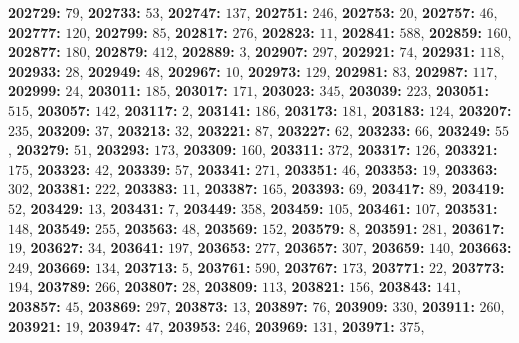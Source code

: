 \textsf{\bfseries 202729:} $79$, \textsf{\bfseries 202733:} $53$, \textsf{\bfseries 202747:} $137$, \textsf{\bfseries 202751:} $246$, \textsf{\bfseries 202753:} $20$, \textsf{\bfseries 202757:} $46$, \textsf{\bfseries 202777:} $120$, \textsf{\bfseries 202799:} $85$, \textsf{\bfseries 202817:} $276$, \textsf{\bfseries 202823:} $11$, \textsf{\bfseries 202841:} $588$, \textsf{\bfseries 202859:} $160$, \textsf{\bfseries 202877:} $180$, \textsf{\bfseries 202879:} $412$, \textsf{\bfseries 202889:} $3$, \textsf{\bfseries 202907:} $297$, \textsf{\bfseries 202921:} $74$, \textsf{\bfseries 202931:} $118$, \textsf{\bfseries 202933:} $28$, \textsf{\bfseries 202949:} $48$, \textsf{\bfseries 202967:} $10$, \textsf{\bfseries 202973:} $129$, \textsf{\bfseries 202981:} $83$, \textsf{\bfseries 202987:} $117$, \textsf{\bfseries 202999:} $24$, \textsf{\bfseries 203011:} $185$, \textsf{\bfseries 203017:} $171$, \textsf{\bfseries 203023:} $345$, \textsf{\bfseries 203039:} $223$, \textsf{\bfseries 203051:} $515$, \textsf{\bfseries 203057:} $142$, \textsf{\bfseries 203117:} $2$, \textsf{\bfseries 203141:} $186$, \textsf{\bfseries 203173:} $181$, \textsf{\bfseries 203183:} $124$, \textsf{\bfseries 203207:} $235$, \textsf{\bfseries 203209:} $37$, \textsf{\bfseries 203213:} $32$, \textsf{\bfseries 203221:} $87$, \textsf{\bfseries 203227:} $62$, \textsf{\bfseries 203233:} $66$, \textsf{\bfseries 203249:} $55$, \textsf{\bfseries 203279:} $51$, \textsf{\bfseries 203293:} $173$, \textsf{\bfseries 203309:} $160$, \textsf{\bfseries 203311:} $372$, \textsf{\bfseries 203317:} $126$, \textsf{\bfseries 203321:} $175$, \textsf{\bfseries 203323:} $42$, \textsf{\bfseries 203339:} $57$, \textsf{\bfseries 203341:} $271$, \textsf{\bfseries 203351:} $46$, \textsf{\bfseries 203353:} $19$, \textsf{\bfseries 203363:} $302$, \textsf{\bfseries 203381:} $222$, \textsf{\bfseries 203383:} $11$, \textsf{\bfseries 203387:} $165$, \textsf{\bfseries 203393:} $69$, \textsf{\bfseries 203417:} $89$, \textsf{\bfseries 203419:} $52$, \textsf{\bfseries 203429:} $13$, \textsf{\bfseries 203431:} $7$, \textsf{\bfseries 203449:} $358$, \textsf{\bfseries 203459:} $105$, \textsf{\bfseries 203461:} $107$, \textsf{\bfseries 203531:} $148$, \textsf{\bfseries 203549:} $255$, \textsf{\bfseries 203563:} $48$, \textsf{\bfseries 203569:} $152$, \textsf{\bfseries 203579:} $8$, \textsf{\bfseries 203591:} $281$, \textsf{\bfseries 203617:} $19$, \textsf{\bfseries 203627:} $34$, \textsf{\bfseries 203641:} $197$, \textsf{\bfseries 203653:} $277$, \textsf{\bfseries 203657:} $307$, \textsf{\bfseries 203659:} $140$, \textsf{\bfseries 203663:} $249$, \textsf{\bfseries 203669:} $134$, \textsf{\bfseries 203713:} $5$, \textsf{\bfseries 203761:} $590$, \textsf{\bfseries 203767:} $173$, \textsf{\bfseries 203771:} $22$, \textsf{\bfseries 203773:} $194$, \textsf{\bfseries 203789:} $266$, \textsf{\bfseries 203807:} $28$, \textsf{\bfseries 203809:} $113$, \textsf{\bfseries 203821:} $156$, \textsf{\bfseries 203843:} $141$, \textsf{\bfseries 203857:} $45$, \textsf{\bfseries 203869:} $297$, \textsf{\bfseries 203873:} $13$, \textsf{\bfseries 203897:} $76$, \textsf{\bfseries 203909:} $330$, \textsf{\bfseries 203911:} $260$, \textsf{\bfseries 203921:} $19$, \textsf{\bfseries 203947:} $47$, \textsf{\bfseries 203953:} $246$, \textsf{\bfseries 203969:} $131$, \textsf{\bfseries 203971:} $375$, 
